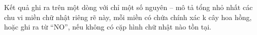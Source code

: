 Kết quả ghi ra trên một dòng với chỉ một số nguyên – mô tả tổng nhỏ nhất các chu vi miền chữ nhật riêng rẽ này, mỗi miền có chứa chính xác k cây hoa hồng, hoặc ghi ra từ “NO”, nếu không có cặp hình chữ nhật nào tồn tại.

\